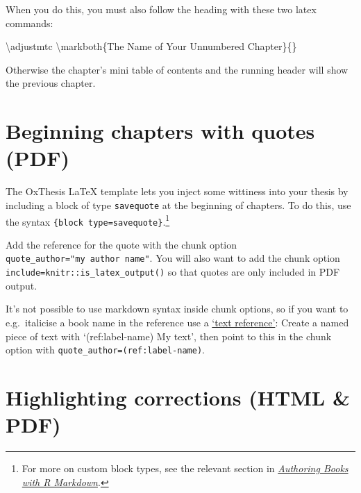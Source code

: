 \documentclass[a4paper, twoside]{templates/ociamthesis}
\newenvironment{Shaded}{\begin{snugshade}}{\end{snugshade}}
\newcommand{\FunctionTok}[1]{\textcolor[rgb]{0.00,0.00,0.00}{#1}}
\newcommand{\NormalTok}[1]{#1}
\renewenvironment{Shaded}
{
  \vspace{10pt}%
  \begin{snugshade}%
}{%
  \end{snugshade}%
  \vspace{8pt}%
}
\begin{document}
When you do this, you must also follow the heading with these two latex commands:

\begin{Shaded}
\begin{Highlighting}[]
\FunctionTok{\textbackslash{}adjustmtc}
\FunctionTok{\textbackslash{}markboth}\NormalTok{\{The Name of Your Unnumbered Chapter\}\{\}}
\end{Highlighting}
\end{Shaded}

Otherwise the chapter's mini table of contents and the running header will show the previous chapter.

\hypertarget{beginning-chapters-with-quotes-pdf}{%
\section{Beginning chapters with quotes (PDF)}\label{beginning-chapters-with-quotes-pdf}}

The OxThesis LaTeX template lets you inject some wittiness into your thesis by including a block of type \texttt{savequote} at the beginning of chapters.
To do this, use the syntax \texttt{\textasciigrave{}\textasciigrave{}\textasciigrave{}\{block\ type=\textquotesingle{}savequote\textquotesingle{}\}}.\footnote{For more on custom block types, see the relevant section in \href{https://bookdown.org/yihui/bookdown/custom-blocks.html}{\emph{Authoring Books with R Markdown}}.}

Add the reference for the quote with the chunk option \texttt{quote\_author="my\ author\ name"}.
You will also want to add the chunk option \texttt{include=knitr::is\_latex\_output()} so that quotes are only included in PDF output.

It's not possible to use markdown syntax inside chunk options, so if you want to e.g.~italicise a book name in the reference use a \href{https://bookdown.org/yihui/bookdown/markdown-extensions-by-bookdown.html\#text-references}{`text reference'}: Create a named piece of text with `(ref:label-name) My text', then point to this in the chunk option with \texttt{quote\_author=\textquotesingle{}(ref:label-name)\textquotesingle{}}.

\hypertarget{highlighting-corrections-html-pdf}{%
\section{Highlighting corrections (HTML \& PDF)}\label{highlighting-corrections-html-pdf}}
\end{document}

